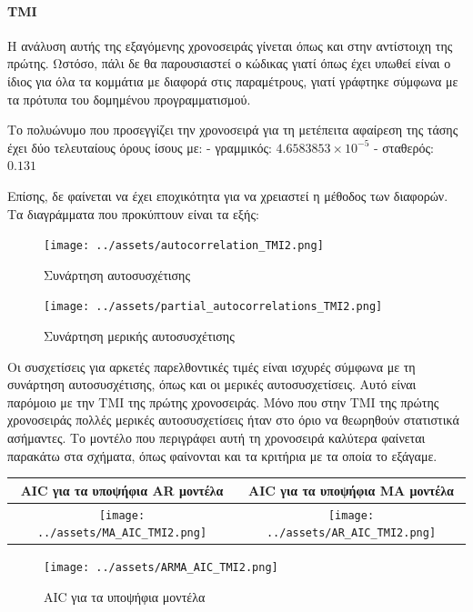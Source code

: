 \documentclass[11pt,]{article}
\let\oldparagraph\paragraph
\renewcommand{\paragraph}[1]{\oldparagraph{#1}\mbox{}}
\begin{document}
\hypertarget{tmi-1}{%
\paragraph{TMI}\label{tmi-1}}

Η ανάλυση αυτής της εξαγόμενης χρονοσειράς γίνεται όπως και στην
αντίστοιχη της πρώτης. Ωστόσο, πάλι δε θα παρουσιαστεί ο κώδικας γιατί
όπως έχει υπωθεί είναι ο ίδιος για όλα τα κομμάτια με διαφορά στις
παραμέτρους, γιατί γράφτηκε σύμφωνα με τα πρότυπα του δομημένου
προγραμματισμού.

Το πολυώνυμο που προσεγγίζει την χρονοσειρά για τη μετέπειτα αφαίρεση
της τάσης έχει δύο τελευταίους όρους ίσους με: - γραμμικός:
\(4.6583853\times 10^{-5}\) - σταθερός: \(0.131\)

Επίσης, δε φαίνεται να έχει εποχικότητα για να χρειαστεί η μέθοδος των
διαφορών. Τα διαγράμματα που προκύπτουν είναι τα εξής:

\begin{figure}
\centering
\texttt{[image: ../assets/autocorrelation\_TMI2.png]}
\caption{Συνάρτηση αυτοσυσχέτισης}
\end{figure}

\begin{figure}
\centering
\texttt{[image: ../assets/partial\_autocorrelations\_TMI2.png]}
\caption{Συνάρτηση μερικής αυτοσυσχέτισης}
\end{figure}

Οι συσχετίσεις για αρκετές παρελθοντικές τιμές είναι ισχυρές σύμφωνα με
τη συνάρτηση αυτοσυσχέτισης, όπως και οι μερικές αυτοσυσχετίσεις. Αυτό
είναι παρόμοιο με την TMI της πρώτης χρονοσειράς. Μόνο που στην TMI της
πρώτης χρονοσειράς πολλές μερικές αυτοσυσχετίσεις ήταν στο όριο να
θεωρηθούν στατιστικά ασήμαντες. Το μοντέλο που περιγράφει αυτή τη
χρονοσειρά καλύτερα φαίνεται παρακάτω στα σχήματα, όπως φαίνονται και τα
κριτήρια με τα οποία το εξάγαμε.

\begin{longtable}[]{@{}cc@{}}
\toprule
AIC για τα υποψήφια AR μοντέλα & AIC για τα υποψήφια MA
μοντέλα\tabularnewline
\midrule
\endhead
\texttt{[image: ../assets/MA\_AIC\_TMI2.png]}
&
\texttt{[image: ../assets/AR\_AIC\_TMI2.png]}\tabularnewline
\bottomrule
\end{longtable}

\begin{figure}
\centering
\texttt{[image: ../assets/ARMA\_AIC\_TMI2.png]}
\caption{AIC για τα υποψήφια μοντέλα}
\end{figure}
\end{document}
